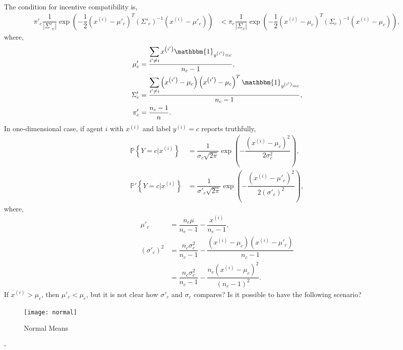 \documentclass{article}
\begin{document}
The condition for incentive compatibility is,
\begin{align*}
\pi'_{c} \dfrac{1}{\left| \Sigma'_{c} \right|} \exp\left(- \dfrac{1}{2} \left(x^{\left(i\right)} - \mu'_{c}\right)^{T} \left(\Sigma'_{c}\right)^{-1} \left(x^{\left(i\right)} - \mu'_{c}\right)\right) &< \pi_{c} \dfrac{1}{\left| \Sigma_{c} \right|} \exp\left(- \dfrac{1}{2} \left(x^{\left(i\right)} - \mu_{c}\right)^{T} \left(\Sigma_{c}\right)^{-1} \left(x^{\left(i\right)} - \mu_{c}\right)\right),
\end{align*}
where,
\begin{align*}
\mu'_{c} &= \dfrac{\displaystyle\sum_{i' \neq  i} x^{\left(i'\right)} \mathbbm{1}_{y^{\left(i'\right)} = c}}{n_{c} - 1},
\\ \Sigma'_{c} &= \dfrac{\displaystyle\sum_{i' \neq  i} \left(x^{\left(i'\right)} - \mu_{c}\right) \left(x^{\left(i'\right)} - \mu_{c}\right)^{T} \mathbbm{1}_{y^{\left(i'\right)} = c}}{n_{c} - 1},
\\ \pi'_{c} &= \dfrac{n_{c} - 1}{n} .
\end{align*}
In one-dimensional case, if agent $i $ with $x^{\left(i\right)}$ and label $y^{\left(i\right)} = c $ reports truthfully,
\begin{align*}
\mathbb{P} \left\{Y = c | x^{\left(i\right)}\right\} &= \dfrac{1}{\sigma_{c} \sqrt{2 \pi}} \exp\left(- \dfrac{\left(x^{\left(i\right)} - \mu_{c}\right)^{2}}{2 \sigma_{c}^{2}}\right),
\\ \mathbb{P}' \left\{Y = c | x^{\left(i\right)}\right\} &= \dfrac{1}{\sigma'_{c} \sqrt{2 \pi}} \exp\left(- \dfrac{\left(x^{\left(i\right)} - \mu'_{c}\right)^{2}}{2 \left(\sigma'_{c}\right)^{2}}\right),
\end{align*}
where,
\begin{align*}
\mu'_{c} &= \dfrac{n_{c} \mu}{n_{c} - 1} - \dfrac{x^{\left(i\right)}}{n_{c} - 1} ,
\\ \left(\sigma'_{c}\right)^{2} &= \dfrac{n_{c} \sigma_{c}^{2}}{n_{c} - 1} - \dfrac{\left(x^{\left(i\right)} - \mu_{c}\right) \left(x^{\left(i\right)} - \mu'_{c}\right)}{n_{c} - 1}
\\ &= \dfrac{n_{c} \sigma_{c}^{2}}{n_{c} - 1} - \dfrac{n_{c} \left(x^{\left(i\right)} - \mu_{c}\right)^{2}}{\left(n_{c} - 1\right)^{2}} .
\end{align*}
If $x^{\left(i\right)} > \mu_{c}$, then $\mu'_{c} < \mu_{c}$, but it is not clear how $\sigma'_{c}$ and $\sigma_{c}$ compares? Is it possible to have the following scenario?
\begin{figure}[H]
\centering
\texttt{[image: normal]}
\caption{Normal Means}
\end{figure}
 -
\newline \newline
\end{document}
